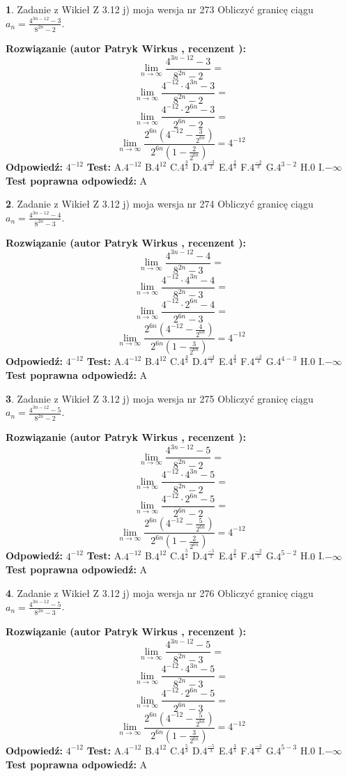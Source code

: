 \documentclass[12pt, a4paper]{article}
\theoremstyle{definition} %
\newtheorem{zad}{}
\newcommand{\zadStart}[1]{\begin{zad}#1\newline}
\newcommand{\zadStop}{\end{zad}}
\newcommand{\rozwStart}[2]{\noindent \textbf{Rozwiązanie (autor #1 , recenzent #2): }\newline}
\newcommand{\rozwStop}{\newline}
\newcommand{\odpStart}{\noindent \textbf{Odpowiedź:}\newline}
\newcommand{\odpStop}{\newline}
\newcommand{\testStart}{\noindent \textbf{Test:}\newline}
\newcommand{\testStop}{\newline}
\newcommand{\kluczStart}{\noindent \textbf{Test poprawna odpowiedź:}\newline}
\newcommand{\kluczStop}{\newline}
\begin{document}
\zadStart{Zadanie z Wikieł Z 3.12 j) moja wersja nr 273}
Obliczyć granicę ciągu $a_{n}=\frac{4^{3n-12}-3}{8^{2n}-2}$.
\zadStop
\rozwStart{Patryk Wirkus}{}
$$\lim\limits_{n\to\infty}\frac{4^{3n-12}-3}{8^{2n}-2}=$$
$$\lim\limits_{n\to\infty}\frac{4^{-12} \cdot 4^{3n}-3}{8^{2n}-2}=$$
$$\lim\limits_{n\to\infty}\frac{4^{-12} \cdot 2^{6n}-3}{2^{6n}-2}=$$
$$\lim\limits_{n\to\infty}\frac{2^{6n}(4^{-12} - \frac{3}{2^{6n}})}{2^{6n}(1-\frac{2}{2^{6n}})}= 4^{-12}$$
\rozwStop
\odpStart
$4^{-12}$
\odpStop
\testStart
A.$4^{-12}$
B.$4^{12}$
C.$4^{\frac{3}{2}}$
D.$4^{\frac{-3}{2}}$
E.$4^{\frac{2}{3}}$
F.$4^{\frac{-2}{3}}$
G.$4^{3-2}$
H.$0$
I.$-\infty$
\testStop
\kluczStart
A
\kluczStop



\zadStart{Zadanie z Wikieł Z 3.12 j) moja wersja nr 274}
Obliczyć granicę ciągu $a_{n}=\frac{4^{3n-12}-4}{8^{2n}-3}$.
\zadStop
\rozwStart{Patryk Wirkus}{}
$$\lim\limits_{n\to\infty}\frac{4^{3n-12}-4}{8^{2n}-3}=$$
$$\lim\limits_{n\to\infty}\frac{4^{-12} \cdot 4^{3n}-4}{8^{2n}-3}=$$
$$\lim\limits_{n\to\infty}\frac{4^{-12} \cdot 2^{6n}-4}{2^{6n}-3}=$$
$$\lim\limits_{n\to\infty}\frac{2^{6n}(4^{-12} - \frac{4}{2^{6n}})}{2^{6n}(1-\frac{3}{2^{6n}})}= 4^{-12}$$
\rozwStop
\odpStart
$4^{-12}$
\odpStop
\testStart
A.$4^{-12}$
B.$4^{12}$
C.$4^{\frac{4}{3}}$
D.$4^{\frac{-4}{3}}$
E.$4^{\frac{3}{4}}$
F.$4^{\frac{-3}{4}}$
G.$4^{4-3}$
H.$0$
I.$-\infty$
\testStop
\kluczStart
A
\kluczStop



\zadStart{Zadanie z Wikieł Z 3.12 j) moja wersja nr 275}
Obliczyć granicę ciągu $a_{n}=\frac{4^{3n-12}-5}{8^{2n}-2}$.
\zadStop
\rozwStart{Patryk Wirkus}{}
$$\lim\limits_{n\to\infty}\frac{4^{3n-12}-5}{8^{2n}-2}=$$
$$\lim\limits_{n\to\infty}\frac{4^{-12} \cdot 4^{3n}-5}{8^{2n}-2}=$$
$$\lim\limits_{n\to\infty}\frac{4^{-12} \cdot 2^{6n}-5}{2^{6n}-2}=$$
$$\lim\limits_{n\to\infty}\frac{2^{6n}(4^{-12} - \frac{5}{2^{6n}})}{2^{6n}(1-\frac{2}{2^{6n}})}= 4^{-12}$$
\rozwStop
\odpStart
$4^{-12}$
\odpStop
\testStart
A.$4^{-12}$
B.$4^{12}$
C.$4^{\frac{5}{2}}$
D.$4^{\frac{-5}{2}}$
E.$4^{\frac{2}{5}}$
F.$4^{\frac{-2}{5}}$
G.$4^{5-2}$
H.$0$
I.$-\infty$
\testStop
\kluczStart
A
\kluczStop



\zadStart{Zadanie z Wikieł Z 3.12 j) moja wersja nr 276}
Obliczyć granicę ciągu $a_{n}=\frac{4^{3n-12}-5}{8^{2n}-3}$.
\zadStop
\rozwStart{Patryk Wirkus}{}
$$\lim\limits_{n\to\infty}\frac{4^{3n-12}-5}{8^{2n}-3}=$$
$$\lim\limits_{n\to\infty}\frac{4^{-12} \cdot 4^{3n}-5}{8^{2n}-3}=$$
$$\lim\limits_{n\to\infty}\frac{4^{-12} \cdot 2^{6n}-5}{2^{6n}-3}=$$
$$\lim\limits_{n\to\infty}\frac{2^{6n}(4^{-12} - \frac{5}{2^{6n}})}{2^{6n}(1-\frac{3}{2^{6n}})}= 4^{-12}$$
\rozwStop
\odpStart
$4^{-12}$
\odpStop
\testStart
A.$4^{-12}$
B.$4^{12}$
C.$4^{\frac{5}{3}}$
D.$4^{\frac{-5}{3}}$
E.$4^{\frac{3}{5}}$
F.$4^{\frac{-3}{5}}$
G.$4^{5-3}$
H.$0$
I.$-\infty$
\testStop
\kluczStart
A
\kluczStop
\end{document}
